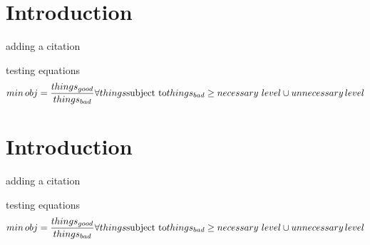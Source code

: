\section{Introduction}

adding a citation \cite{Pouransari_2014}

testing equations
\begin{equation}
min \, obj= \frac{things_{good}}{things_{bad}} \forall things\\
\text{subject to}  \\
things_{bad}\ge necessary\,\, level \cup unnecessary \, level
\end{equation}


\section{Introduction}

adding a citation \cite{Pouransari_2014}

testing equations
\begin{equation}
min \, obj= \frac{things_{good}}{things_{bad}} \forall things\\
\text{subject to}  \\
things_{bad}\ge necessary\,\, level \cup unnecessary \, level
\end{equation}